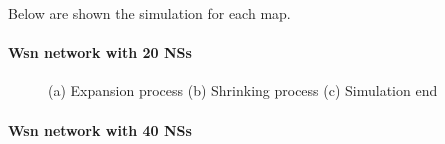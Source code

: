 Below are shown the simulation for each map. 

\paragraph{Wsn network with 20 NSs}

\begin{figure}[H]
    \centering
    \caption{(a) Expansion process (b) Shrinking process (c) Simulation end}
    \label{fig:foobar}
\end{figure}

\paragraph{Wsn network with 40 NSs}

